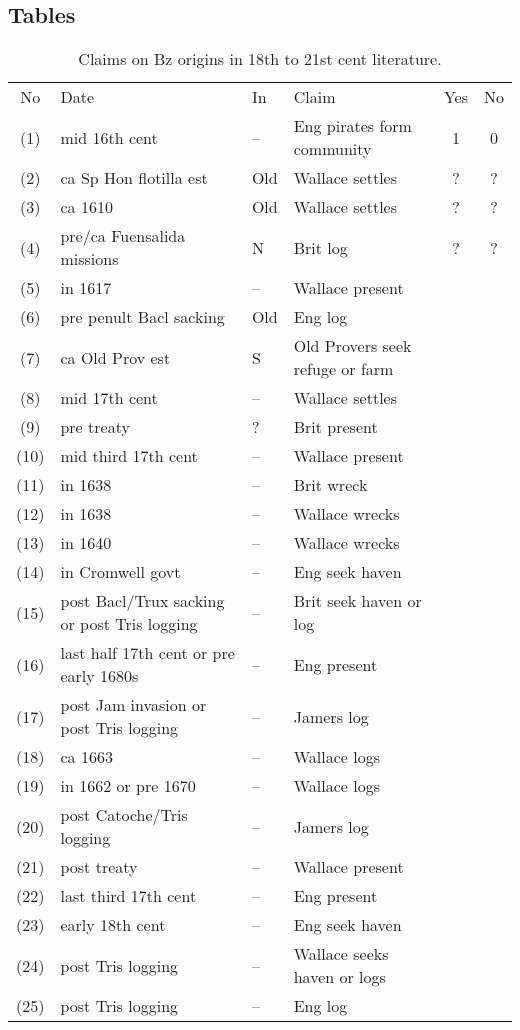 \documentclass{amsart}
\theoremstyle{definition}%
\theoremstyle{definition}%
\begin{document}
\subsection{Tables}
\label{ss:tables}
\lipsum[1][1-3]
%
%
\begin{table}%
\caption{Claims on Bz origins in 18th to 21st cent literature.}
\label{tab1}
\begin{sideways}
\begin{tabular}{cp{.4\textheight}lp{.3\textheight}cc}
No	&Date	&In	&Claim	&Yes	&No\\
(1)	&mid 16th cent	&--	&Eng pirates form community	&1	&0\\%
(2)	&ca Sp Hon flotilla est	&Old	&Wallace settles	&?	&?\\%
(3)	&ca 1610	&Old&Wallace settles	&?	&?\\%
(4)	&pre/ca Fuensalida missions	&N	&Brit log	&?	&?\\%
(5)	&in 1617	&--	&Wallace present&&\\%
(6)	&pre penult Bacl sacking	&Old	&Eng log	&&\\%
(7)	&ca Old Prov est	&S	&Old Provers seek refuge or farm	&&\\%
(8)	&mid 17th cent	&--	&Wallace settles	&&\\%
(9)	&pre treaty	&?	&Brit present	&&\\%
(10)	&mid third 17th cent	&--	&Wallace present	&&\\%
(11)	&in 1638	&--	&Brit wreck	&&\\%
(12)	&in 1638	&--	&Wallace wrecks	&&\\%
(13)	&in 1640	&--	&Wallace wrecks	&&\\%
(14)	&in Cromwell govt	&--	&Eng seek haven	&&\\%
(15)	&post Bacl/Trux sacking or post Tris logging	&--	&Brit seek haven or log	&&\\%
(16)	&last half 17th cent or pre early 1680s	&--	&Eng present	&&\\%
(17)	&post Jam invasion or post Tris logging	&--	&Jamers log	&&\\%
(18)	&ca 1663	&--	&Wallace logs	&&\\%
(19)	&in 1662	 or pre 1670&--	&Wallace logs	&&\\%
(20)	&post Catoche/Tris logging	&--	&Jamers log	&&\\%
(21)	&post treaty	&--	&Wallace present	&&\\%
(22)	&last third 17th cent	&--	&Eng present	&&\\%
(23)	&early 18th cent	&--	&Eng seek haven	&&\\%
(24)	&post Tris logging	&--	&Wallace seeks haven or logs	&&\\%
(25)	&post Tris logging	&--	&Eng log	&&%
\end{tabular}
\end{sideways}
\end{table}
%
%
\end{document}
